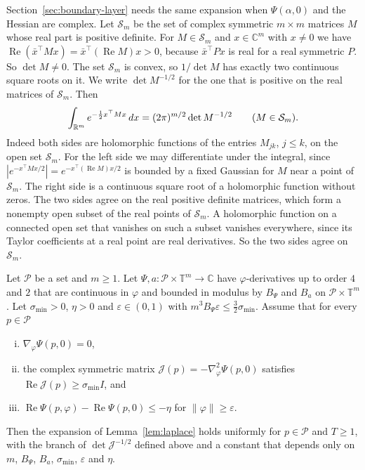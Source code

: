 Section~\ref{sec:boundary-layer} needs the same expansion when $\Psi(\alpha,0)$ and the Hessian
are complex. Let $\mathcal S_m$ be the set of complex symmetric $m\times m$ matrices $M$ whose
real part is positive definite. For $M\in\mathcal S_m$ and $x\in\mathbb C^m$ with $x\ne0$ we have
$\operatorname{Re}(\bar x^\top Mx)=\bar x^\top(\operatorname{Re}M)x>0$, because $\bar x^\top Px$ is
real for a real symmetric $P$. So $\det M\ne0$. The set $\mathcal S_m$ is convex, so $1/\det M$ has
exactly two continuous square roots on it. We write $\det M^{-1/2}$ for the one that is positive
on the real matrices of $\mathcal S_m$. Then
\[
\int_{\mathbb{R}^m}e^{-\frac12x^\top Mx}\,dx=(2\pi)^{m/2}\det M^{-1/2}\qquad(M\in\mathcal S_m).
\]
Indeed both sides are holomorphic functions of the entries $M_{jk}$, $j\le k$, on the open set
$\mathcal S_m$. For the left side we may differentiate under the integral, since
$|e^{-x^\top Mx/2}|=e^{-x^\top(\operatorname{Re}M)x/2}$ is bounded by a fixed Gaussian for $M$
near a point of $\mathcal S_m$. The right side is a continuous square root of a holomorphic
function without zeros. The two sides agree on the real positive definite matrices, which form a
nonempty open subset of the real points of $\mathcal S_m$. A holomorphic function on a connected
open set that vanishes on such a subset vanishes everywhere, since its Taylor coefficients at a
real point are real derivatives. So the two sides agree on $\mathcal S_m$.

\begin{lemma}\label{lem:laplace-complex}
Let $\mathcal P$ be a set and $m\ge1$. Let $\Psi,a:\mathcal P\times\mathbb T^m\to\mathbb C$ have
$\varphi$-derivatives up to order $4$ and $2$ that are continuous in $\varphi$ and bounded in
modulus by $B_\Psi$ and $B_a$ on $\mathcal P\times\mathbb T^m$. Let $\sigma_{\min}>0$, $\eta>0$ and
$\varepsilon\in(0,1)$ with $m^3B_\Psi\varepsilon\le\frac32\sigma_{\min}$. Assume that for every
$p\in\mathcal P$
\begin{enumerate}[(i)]
\item $\nabla_\varphi\Psi(p,0)=0$,
\item the complex symmetric matrix $\mathcal J(p)=-\nabla^2_\varphi\Psi(p,0)$ satisfies
$\operatorname{Re}\mathcal J(p)\ge\sigma_{\min}I$, and
\item $\operatorname{Re}\Psi(p,\varphi)-\operatorname{Re}\Psi(p,0)\le-\eta$ for
$\lVert\varphi\rVert\ge\varepsilon$.
\end{enumerate}
Then the expansion of Lemma~\ref{lem:laplace} holds uniformly for $p\in\mathcal P$ and $T\ge1$,
with the branch of $\det\mathcal J^{-1/2}$ defined above and a constant that depends only on $m$,
$B_\Psi$, $B_a$, $\sigma_{\min}$, $\varepsilon$ and $\eta$.
\end{lemma}

